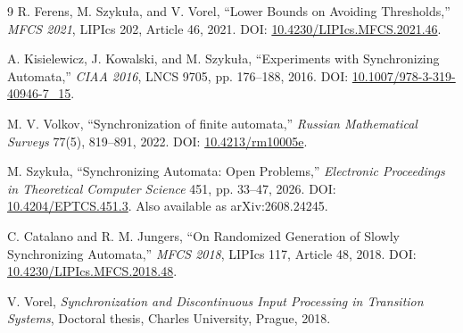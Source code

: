 \documentclass[11pt]{article}
\theoremstyle{definition}
\theoremstyle{remark}
\begin{document}
\begin{thebibliography}{9}
R. Ferens, M. Szyku\l a, and V. Vorel,
``Lower Bounds on Avoiding Thresholds,''
\emph{MFCS 2021}, LIPIcs 202, Article 46, 2021.
DOI: \href{https://doi.org/10.4230/LIPIcs.MFCS.2021.46}{10.4230/LIPIcs.MFCS.2021.46}.

A. Kisielewicz, J. Kowalski, and M. Szyku\l a,
``Experiments with Synchronizing Automata,''
\emph{CIAA 2016}, LNCS 9705, pp. 176--188, 2016.
DOI: \href{https://doi.org/10.1007/978-3-319-40946-7_15}{10.1007/978-3-319-40946-7\_15}.

M. V. Volkov,
``Synchronization of finite automata,''
\emph{Russian Mathematical Surveys} 77(5), 819--891, 2022.
DOI: \href{https://doi.org/10.4213/rm10005e}{10.4213/rm10005e}.

M. Szyku\l a,
``Synchronizing Automata: Open Problems,''
\emph{Electronic Proceedings in Theoretical Computer Science} 451, pp. 33--47, 2026.
DOI: \href{https://doi.org/10.4204/EPTCS.451.3}{10.4204/EPTCS.451.3}.
Also available as arXiv:2608.24245.


C. Catalano and R. M. Jungers,
``On Randomized Generation of Slowly Synchronizing Automata,''
\emph{MFCS 2018}, LIPIcs 117, Article 48, 2018.
DOI: \href{https://doi.org/10.4230/LIPIcs.MFCS.2018.48}{10.4230/LIPIcs.MFCS.2018.48}.

V. Vorel,
\emph{Synchronization and Discontinuous Input Processing in Transition Systems},
Doctoral thesis, Charles University, Prague, 2018.

\end{thebibliography}
\end{document}
